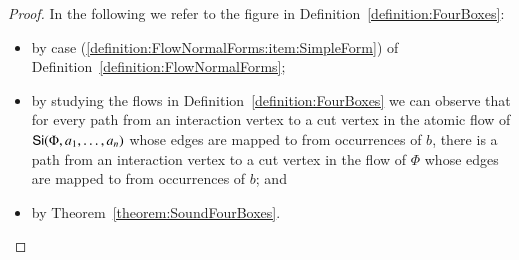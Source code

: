 \begin{proof}
In the following we refer to the figure in Definition~\vref{definition:FourBoxes}:
\begin{itemize}
\item by case (\ref{definition:FlowNormalForms:item:SimpleForm}) of Definition~\vref{definition:FlowNormalForms};
\item by studying the flows in Definition~\ref{definition:FourBoxes} we can observe that for every path from an interaction vertex to a cut vertex in the atomic flow of $\mathsf{Si}(\Phi,a_1,\dots,a_n)$ whose edges are mapped to from occurrences of $b$, there is a path from an interaction vertex to a cut vertex in the flow of $\Phi$ whose edges are mapped to from occurrences of $b$; and
\item by Theorem~\vref{theorem:SoundFourBoxes}.
\end{itemize}
\end{proof}
